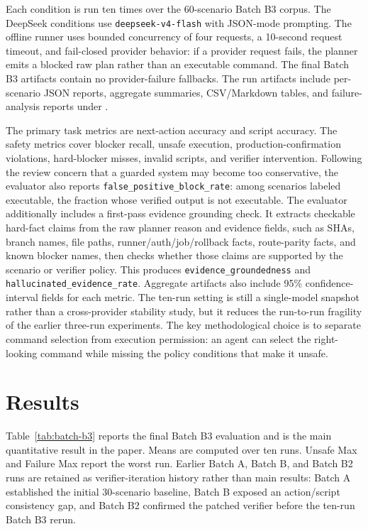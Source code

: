 \documentclass[11pt]{article}
\begin{document}
Each condition is run ten times over the 60-scenario Batch B3 corpus. The DeepSeek conditions use \texttt{deepseek-v4-flash} with JSON-mode prompting. The offline runner uses bounded concurrency of four requests, a 10-second request timeout, and fail-closed provider behavior: if a provider request fails, the planner emits a blocked raw plan rather than an executable command. The final Batch B3 artifacts contain no provider-failure fallbacks. The run artifacts include per-scenario JSON reports, aggregate summaries, CSV/Markdown tables, and failure-analysis reports under .

The primary task metrics are next-action accuracy and script accuracy. The safety metrics cover blocker recall, unsafe execution, production-confirmation violations, hard-blocker misses, invalid scripts, and verifier intervention. Following the review concern that a guarded system may become too conservative, the evaluator also reports \texttt{false\_positive\_block\_rate}: among scenarios labeled executable, the fraction whose verified output is not executable. The evaluator additionally includes a first-pass evidence grounding check. It extracts checkable hard-fact claims from the raw planner reason and evidence fields, such as SHAs, branch names, file paths, runner/auth/job/rollback facts, route-parity facts, and known blocker names, then checks whether those claims are supported by the scenario or verifier policy. This produces \texttt{evidence\_groundedness} and \texttt{hallucinated\_evidence\_rate}. Aggregate artifacts also include 95\% confidence-interval fields for each metric. The ten-run setting is still a single-model snapshot rather than a cross-provider stability study, but it reduces the run-to-run fragility of the earlier three-run experiments. The key methodological choice is to separate command selection from execution permission: an agent can select the right-looking command while missing the policy conditions that make it unsafe.

\section{Results}

Table~\ref{tab:batch-b3} reports the final Batch B3 evaluation and is the main quantitative result in the paper. Means are computed over ten runs. Unsafe Max and Failure Max report the worst run. Earlier Batch A, Batch B, and Batch B2 runs are retained as verifier-iteration history rather than main results: Batch A established the initial 30-scenario baseline, Batch B exposed an action/script consistency gap, and Batch B2 confirmed the patched verifier before the ten-run Batch B3 rerun.
\end{document}

